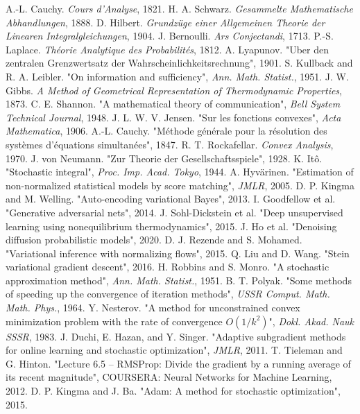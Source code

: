 \documentclass[11pt]{book}
\begin{document}

\begin{thebibliography}{99}
 A.-L. Cauchy. \emph{Cours d'Analyse}, 1821.
 H. A. Schwarz. \emph{Gesammelte Mathematische Abhandlungen}, 1888.
 D. Hilbert. \emph{Grundzüge einer Allgemeinen Theorie der Linearen Integralgleichungen}, 1904.
 J. Bernoulli. \emph{Ars Conjectandi}, 1713.
 P.-S. Laplace. \emph{Théorie Analytique des Probabilités}, 1812.
 A. Lyapunov. "Uber den zentralen Grenzwertsatz der Wahrscheinlichkeitsrechnung", 1901.
 S. Kullback and R. A. Leibler. "On information and sufficiency", \emph{Ann. Math. Statist.}, 1951.
 J. W. Gibbs. \emph{A Method of Geometrical Representation of Thermodynamic Properties}, 1873.
 C. E. Shannon. "A mathematical theory of communication", \emph{Bell System Technical Journal}, 1948.
 J. L. W. V. Jensen. "Sur les fonctions convexes", \emph{Acta Mathematica}, 1906.
 A.-L. Cauchy. "Méthode générale pour la résolution des systèmes d'équations simultanées", 1847.
 R. T. Rockafellar. \emph{Convex Analysis}, 1970.
 J. von Neumann. "Zur Theorie der Gesellschaftsspiele", 1928.
 K. Itô. "Stochastic integral", \emph{Proc. Imp. Acad. Tokyo}, 1944.
 A. Hyvärinen. "Estimation of non-normalized statistical models by score matching", \emph{JMLR}, 2005.
 D. P. Kingma and M. Welling. "Auto-encoding variational Bayes", 2013.
 I. Goodfellow et al. "Generative adversarial nets", 2014.
 J. Sohl-Dickstein et al. "Deep unsupervised learning using nonequilibrium thermodynamics", 2015.
 J. Ho et al. "Denoising diffusion probabilistic models", 2020.
 D. J. Rezende and S. Mohamed. "Variational inference with normalizing flows", 2015.
 Q. Liu and D. Wang. "Stein variational gradient descent", 2016.
 H. Robbins and S. Monro. "A stochastic approximation method", \emph{Ann. Math. Statist.}, 1951.
 B. T. Polyak. "Some methods of speeding up the convergence of iteration methods", \emph{USSR Comput. Math. Math. Phys.}, 1964.
 Y. Nesterov. "A method for unconstrained convex minimization problem with the rate of convergence $O(1/k^2)$", \emph{Dokl. Akad. Nauk SSSR}, 1983.
 J. Duchi, E. Hazan, and Y. Singer. "Adaptive subgradient methods for online learning and stochastic optimization", \emph{JMLR}, 2011.
 T. Tieleman and G. Hinton. "Lecture 6.5 -- RMSProp: Divide the gradient by a running average of its recent magnitude", COURSERA: Neural Networks for Machine Learning, 2012.
 D. P. Kingma and J. Ba. "Adam: A method for stochastic optimization", 2015.
\end{thebibliography}
\end{document}
